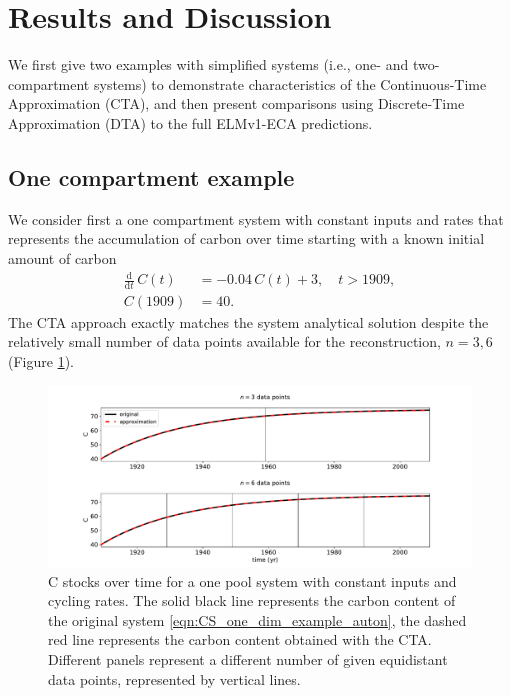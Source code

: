 \documentclass[draft]{agujournal2019}
\newcommand{\deriv}[1]{\frac{\mathrm{d}}{\mathrm{d}#1}}
\begin{document}
\section{Results and Discussion}
We first give two examples with simplified systems (i.e., one- and two-compartment systems) to demonstrate characteristics of the Continuous-Time Approximation (CTA), and then present comparisons using Discrete-Time Approximation (DTA) to the full ELMv1-ECA predictions. 
\subsection{One compartment example}
We consider first a one compartment system with constant inputs and rates that represents the accumulation of carbon over time starting with a known initial amount of carbon
\begin{equation}\label{eqn:CS_one_dim_example_auton}
    \begin{aligned}
        \deriv{t}\,C(t) &= -0.04\,C(t) + 3,\quad t>1909,\\
        C(1909) &= 40.
    \end{aligned}
\end{equation}
The CTA approach exactly matches the system analytical solution despite the relatively small number of data points available for the reconstruction, $n=3,6$ (Figure \ref{fig:CS_one_dim_example_auton}).

\begin{figure}[htbp]
    \centering 
    \includegraphics[width=1.0\linewidth]{figs/interpol_pwc_1_auton.pdf}
    \caption{C stocks over time for a one pool system with constant inputs and cycling rates.
        The solid black line represents the carbon content of the original system \eqref{eqn:CS_one_dim_example_auton}, the dashed red line represents the carbon content obtained with the CTA.
        Different panels represent a different number of given equidistant data points, represented by vertical lines.
        }
    \label{fig:CS_one_dim_example_auton}
\end{figure}        
\end{document}
